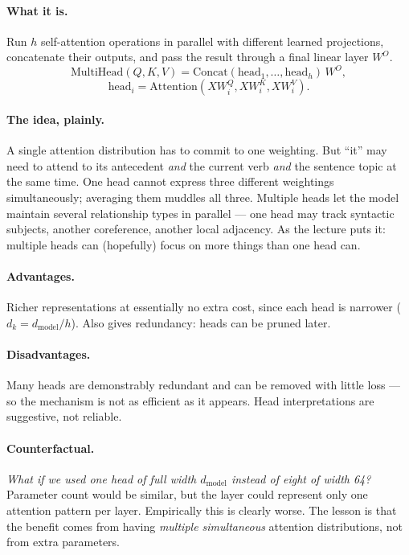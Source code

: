 \documentclass[11pt,a4paper]{article}
\begin{document}
\paragraph{What it is.} Run $h$ self-attention operations in parallel with different learned
projections, concatenate their outputs, and pass the result through a final linear layer
$W^O$.
\[
\mathrm{MultiHead}(Q,K,V) = \mathrm{Concat}(\mathrm{head}_1, \ldots, \mathrm{head}_h)\,W^O,
\]
\[
\mathrm{head}_i = \mathrm{Attention}(XW_i^Q, XW_i^K, XW_i^V).
\]

\paragraph{The idea, plainly.} A single attention distribution has to commit to one
weighting. But ``it'' may need to attend to its antecedent \emph{and} the current verb
\emph{and} the sentence topic at the same time. One head cannot express three different
weightings simultaneously; averaging them muddles all three. Multiple heads let the model
maintain several relationship types in parallel --- one head may track syntactic subjects,
another coreference, another local adjacency. As the lecture puts it: multiple heads can
(hopefully) focus on more things than one head can.

\paragraph{Advantages.} Richer representations at essentially no extra cost, since each head
is narrower ($d_k = d_{\text{model}} / h$). Also gives redundancy: heads can be pruned later.

\paragraph{Disadvantages.} Many heads are demonstrably redundant and can be removed with
little loss --- so the mechanism is not as efficient as it appears. Head interpretations are
suggestive, not reliable.

\paragraph{Counterfactual.} \emph{What if we used one head of full width $d_{\text{model}}$
instead of eight of width 64?} Parameter count would be similar, but the layer could
represent only one attention pattern per layer. Empirically this is clearly worse. The
lesson is that the benefit comes from having \emph{multiple simultaneous} attention
distributions, not from extra parameters.
\end{document}

